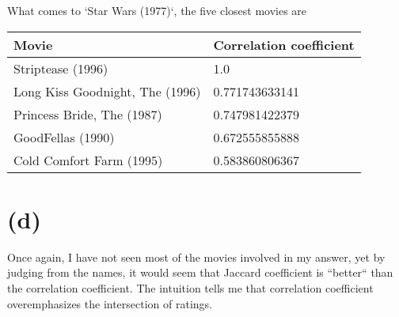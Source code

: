 \documentclass[10pt]{article}
\begin{document}
What comes to `Star Wars (1977)`, the five closest movies are
\begin{center}
\begin{tabular}{|l|l|}
\hline
Movie & Correlation coefficient \\
\hline
Striptease (1996) & 1.0 \\
Long Kiss Goodnight, The (1996)  & 0.771743633141 \\
Princess Bride, The (1987) & 0.747981422379 \\
GoodFellas (1990) & 0.672555855888 \\
Cold Comfort Farm (1995) & 0.583860806367 \\
\hline
\end{tabular}
\end{center}

\section*{(d)}
Once again, I have not seen most of the movies involved in my answer, yet by judging from the names, it would seem that Jaccard coefficient is ``better`` than the correlation coefficient. The intuition tells me that correlation coefficient overemphasizes the intersection of ratings. 
\end{document}
